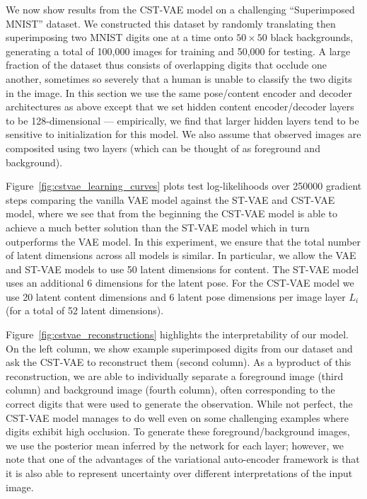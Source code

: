 
We now show results from the CST-VAE model on a challenging ``Superimposed MNIST'' dataset.
We constructed this dataset
by randomly translating then superimposing two MNIST digits one at a time onto $50\times 50$ black backgrounds,
generating a total of 100,000 images for training and 50,000 for testing.  
A large fraction of the dataset thus consists of overlapping digits that occlude one another, sometimes so severely that
a human is unable to classify the two digits in the image.
In this section we use the same pose/content encoder and decoder
architectures as above except that we set hidden content encoder/decoder layers to be 128-dimensional --- empirically,
we find that larger hidden layers tend to be sensitive to initialization for this model.
We also assume that observed images are composited
using two layers (which can be thought of as foreground and background).

Figure~\ref{fig:cstvae_learning_curves}
plots test log-likelihoods over 250000 gradient steps
comparing the vanilla VAE model against the ST-VAE and CST-VAE model, where 
we see that from the beginning the CST-VAE
model is able to achieve a much better solution than the ST-VAE model
which in turn outperforms the VAE model.   
In this experiment, we ensure that the total number of latent dimensions across all
models is similar.
In particular, 
we allow the VAE and ST-VAE models to use 50 latent dimensions for content.
The ST-VAE model uses an additional 6 dimensions for the latent pose.
For the CST-VAE model we use 20 latent content dimensions
and 6 latent pose dimensions per image layer $L_i$ (for a total of 52 latent dimensions). 


Figure~\ref{fig:cstvae_reconstructions} highlights the interpretability of our model.
On the left column, we show example superimposed digits from our dataset and ask the 
CST-VAE to reconstruct them (second column).  As a byproduct of this reconstruction,
we are able to individually separate a foreground image (third column) and background image (fourth column),
often corresponding to the correct digits that were used to generate the observation.  
 While not perfect, the CST-VAE model manages to do well even on some challenging examples where
 digits exhibit high occlusion.  To generate these foreground/background images, we use the posterior mean
 inferred by the network for each layer; however, we note that one of the advantages of the 
 variational auto-encoder framework is that it is also able to represent uncertainty over different interpretations
 of the input image.

